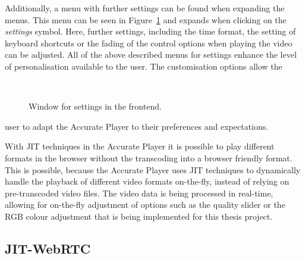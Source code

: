 \documentclass[../MasterThesis.tex]{subfiles}
\begin{document}
\begin{minipage}{0.45\textwidth}
	
Additionally, a menu with further settings can be found when expanding the menus. This menu can be seen in Figure~\ref{figure:othercontrols} and expands when clicking on the \textit{settings} symbol. Here, further settings, including the time format, the setting of keyboard shortcuts or the fading of the control options when playing the video can be adjusted. All of the above described menus for settings enhance the level of personalisation available to the user. The customisation options allow the 
%
%
\end{minipage}\begin{minipage}{0.05\textwidth}
	\ 
\end{minipage}\begin{minipage}{0.5\textwidth}
%
%
\begin{figure}[H]
	\begin{center}
		\caption[Window for settings in the frontend.]{Window for settings in the frontend.}
		\label{figure:othercontrols}
	\end{center}
\end{figure}
\vfill
\end{minipage}
%

user to adapt the Accurate Player to their preferences and expectations. 


With JIT techniques in the Accurate Player it is possible to play different formats in the browser without the transcoding into a browser friendly format.
This is possible, because the Accurate Player uses JIT techniques to dynamically handle the playback of different video formats on-the-fly, instead of relying on pre-transcoded video files. The video data is being processed in real-time, allowing for on-the-fly adjustment of options such as the quality slider or the RGB colour adjustment that is being implemented for this thesis project.









\subsection{JIT-WebRTC} \label{subsection:jit-webrtc}
\end{document}
